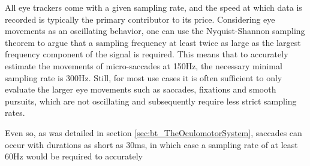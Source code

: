 All eye trackers come with a given sampling rate, and the speed at which data is recorded is typically the primary contributor to its price. Considering eye movements as an oscillating behavior, one can use the Nyquist-Shannon sampling theorem to argue that a sampling frequency at least twice as large as the largest frequency component of the signal is required. This means that to accurately estimate the movements of micro-saccades at 150Hz, the necessary minimal sampling rate is 300Hz. Still, for most use cases it is often sufficient to only evaluate the larger eye movements such as saccades, fixations and smooth pursuits, which are not oscillating and subsequently require less strict sampling rates. 

Even so, as was detailed in section \ref{sec:bt_TheOculomotorSystem}, saccades can occur with durations as short as 30ms, in which case a sampling rate of at least 60Hz would be required to accurately 


